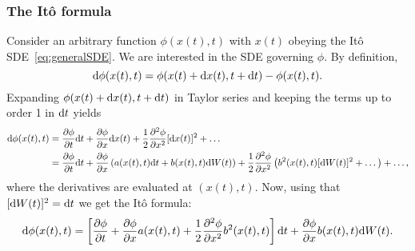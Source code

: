 \subsubsection{The Itô formula}
Consider an arbitrary function $\phi(x(t),t)$ with $x(t)$ obeying the Itô SDE~\eqref{eq:generalSDE}. We are interested in the SDE governing $\phi$. By definition, 
\begin{equation}
	\rm d\phi(x(t),t) = \phi(x(t)+\rm dx(t),t+ \rm dt) - \phi(x(t),t). 	
\end{equation}
Expanding $\phi(x(t)+\rm dx(t),t+ \rm dt)$ in Taylor series and keeping the terms up to order 1 in $\rm dt$ yields
\begin{align}
\rm d\phi(x(t),t) &= \frac{\partial \phi}{\partial t}\rm dt + \frac{\partial \phi}{\partial x}\rm dx(t) + \frac{1}{2} \frac{\partial^2 \phi}{\partial x^2} [\rm dx(t)]^2 + \dots \nonumber\\
&= \frac{\partial \phi}{\partial t}\rm dt + \frac{\partial \phi}{\partial x}\left(a(x(t),t) \rm dt + b(x(t),t) \rm dW(t)\right) + \frac{1}{2} \frac{\partial^2 \phi}{\partial x^2} \left(b^2(x(t),t) [\rm dW(t)]^2 + \dots \right) + \dots, \nonumber
\end{align}
where the derivatives are evaluated at $(x(t),t)$. Now, using that $[\rm dW(t)]^2 = \rm dt$ we get the Itô formula:
\begin{equation} \label{eq:ItoFormula}
	\rm d\phi(x(t),t) = \left[\frac{\partial \phi}{\partial t} + \frac{\partial \phi}{\partial x} a(x(t),t) + \frac{1}{2}\frac{\partial^2 \phi}{\partial x^2} b^2(x(t),t)\right] \rm dt + \frac{\partial \phi}{\partial x}b(x(t),t) \rm dW(t).
\end{equation}

